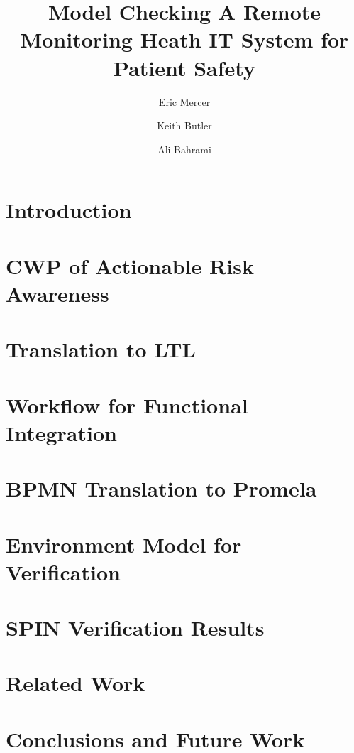\documentclass{llncs}
\begin{document}
\title{
  Model Checking A Remote Monitoring Heath IT System for Patient Safety
}

\author{
Eric Mercer
\and
Keith Butler 
\and
Ali Bahrami
}



\maketitle

\begin{abstract}

\end{abstract}

\section{Introduction}


\section{CWP of Actionable Risk Awareness}


\section{Translation to LTL}


\section{Workflow for Functional Integration}


\section{BPMN Translation to Promela}
\label{sec:bpmn}


\section{Environment Model for Verification}
\label{sec:env}


\section{SPIN Verification Results}
\label{sec:results}


\section{Related Work}


\section{Conclusions and Future Work}


\clearpage


\end{document}
